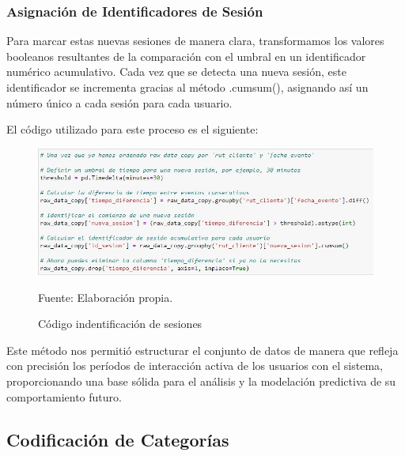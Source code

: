 \subsubsection{Asignación de Identificadores de Sesión} 
Para marcar estas nuevas sesiones de manera clara, transformamos los valores booleanos resultantes de la comparación con el umbral en un identificador numérico acumulativo. Cada vez que se detecta una nueva sesión, este identificador se incrementa gracias al método .cumsum(), asignando así un número único a cada sesión para cada usuario.

El código utilizado para este proceso es el siguiente:

\begin{figure}[H]
    \begin{minipage}[t]{0.9\textwidth}
        \caption{Código indentificación de sesiones}
        \label{identificación_sesiones}        
    \end{minipage}

    \vspace{10pt}

    \begin{minipage}[b]{1\textwidth}
        \centering
        \includegraphics[width=\textwidth]{img/Código identificación sesiones.jpg}        
    \end{minipage}

    \begin{minipage}[t]{0.9\textwidth}
        Fuente: Elaboración propia.
    \end{minipage}
\end{figure}

Este método nos permitió estructurar el conjunto de datos de manera que refleja con precisión los períodos de interacción activa de los usuarios con el sistema, proporcionando una base sólida para el análisis y la modelación predictiva de su comportamiento futuro.

\subsection{Codificación de Categorías}

